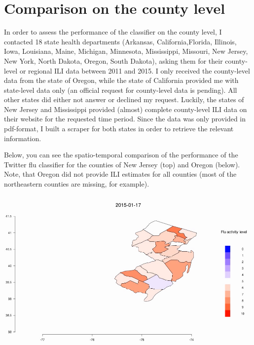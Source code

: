 \documentclass[11pt, a4paper]{report}\usepackage[]{graphicx}\usepackage[]{color}
\begin{document}
\raggedright

\section{Comparison on the county level}
In order to assess the performance of the classifier on the county level, I contacted 18 state health departments (Arkansas, California,Florida, Illinois, Iowa, Louisiana, Maine, Michigan, Minnesota, Mississippi, Missouri, New Jersey, New York, North Dakota, Oregon, South Dakota), asking them for their county-level or regional ILI data between 2011 and 2015. I only received the county-level data from the state of Oregon, while the state of California provided me with state-level data only (an official request for county-level data is pending). All other states did either not answer or declined my request. Luckily, the states of New Jersey and Mississippi provided (almost) complete county-level ILI data on their website for the requested time period. Since the data was only provided in pdf-format, I built a scraper for both states in order to retrieve the relevant information.\newline 

Below, you can see the spatio-temporal comparison of the performance of the Twitter flu classifier for the counties of New Jersey (top) and Oregon (below). Note, that Oregon did not provide ILI estimates for all counties (most of the northeastern counties are missing, for example).\newline

\centering \href{run:vids/county_Twitter_cdc_diff_newjersey.avi}{\includegraphics[scale=0.5]{vids/Screenshot_Jersey.png}} 

\bigskip
\end{document}
